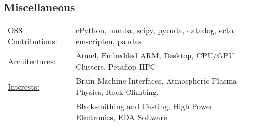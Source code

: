 \documentclass{res}
\begin{document}
\begin{resume}
\section{Miscellaneous}
  \begin{tabular}{l p{5.5in}}
    \underline{OSS Contributions:} & cPython, numba, scipy, pycuda, datadog, ecto, emscripten, pandas  \\
    \underline{Architectures:}     & Atmel, Embedded ARM, Desktop, CPU/GPU Clusters, Petaflop HPC \\
    \underline{Interests:}         & Brain-Machine Interfaces, Atmospheric Plasma Physics, Rock Climbing, \\
                                   & Blacksmithing and Casting, High Power Electronics, EDA Software
 \end{tabular}

\end{resume}
\end{document}
